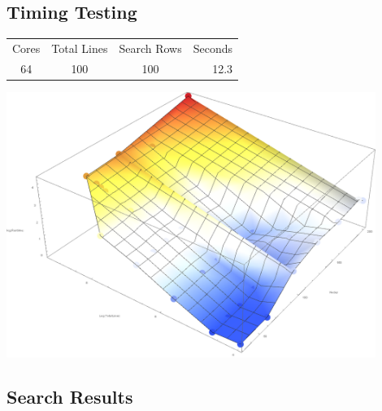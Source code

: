 

%
%

\subsection{Timing Testing}


\begin{tabular}{c c c r}
Cores & Total Lines & Search Rows & Seconds \\
64 & 100 & 100 & 12.3 \\
\end{tabular}

\includegraphics[width=0.9\textwidth]{./images/runtimes.png}


%
%

\subsection{Search Results}

